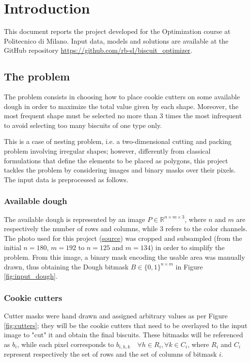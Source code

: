 
\section{Introduction}
This document reports the project developed for the Optimization course at Politecnico di Milano. Input data, models and solutions are available at the GitHub repository \href{https://github.com/rb-sl/biscuit_optimizer}{https://github.com/rb-sl/biscuit\_optimizer}.

\subsection{The problem}
The problem consists in choosing how to place cookie cutters on some available dough in order to maximize the total value given by each shape. Moreover, the most frequent shape must be selected no more than 3 times the most infrequent to avoid selecting too many biscuits of one type only.

This is a case of nesting problem, i.e. a two-dimensional cutting and packing problem involving irregular shapes; however, differently from classical formulations that define the elements to be placed as polygons, this project tackles the problem by considering images and binary masks over their pixels. The input data is preprocessed as follows.

\subsubsection{Available dough}
The available dough is represented by an image $P \in \mathbb{R}^{n \times m \times 3}$, where $n$ and $m$ are respectively the number of rows and columns, while $3$ refers to the color channels. The photo used for this project (\href{https://www.buttalapasta.it/ricette/ricetta-biscotti-al-latte/25247/}{source}) was cropped and subsampled (from the initial $n=180$, $m=192$ to $n=125$ and $m=134$) in order to simplify the problem. From this image, a binary mask encoding the usable area was manually drawn, thus obtaining the Dough bitmask $B \in \{0, 1\}^{n \times m}$ in Figure \ref{fig:input_dough}.

\subsubsection{Cookie cutters}
Cutter masks were hand drawn and assigned arbitrary values as per Figure \ref{fig:cutters}; they will be the cookie cutters that need to be overlayed to the input image to "cut" it and obtain the final biscuits. These bitmasks will be referenced as $b_i$, while each pixel corresponds to $b_{i, h, k} \quad \forall h \in R_i, \forall k \in C_i$, where $R_i$ and $C_i$ represent respectively the set of rows and the set of columns of bitmask $i$.

